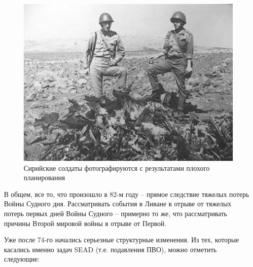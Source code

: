 \begin{figure}[h!tb] 
	\centering\includegraphics[scale=0.5]{Bekaa_1/Kp2dOPbwwQQ.jpg}
	\caption{Сирийские солдаты фотографируются с результатами плохого планирования}%
\end{figure}

В общем, все то, что произошло в 82-м году – прямое следствие тяжелых потерь Войны Судного дня. Рассматривать события в Ливане в отрыве от тяжелых потерь первых дней Войны Судного – примерно то же, что рассматривать причины Второй мировой войны в отрыве от Первой.

Уже после 74-го начались серьезные структурные изменения. Из тех, которые касались именно задач SEAD (т.е. подавления ПВО), можно отметить следующие:

